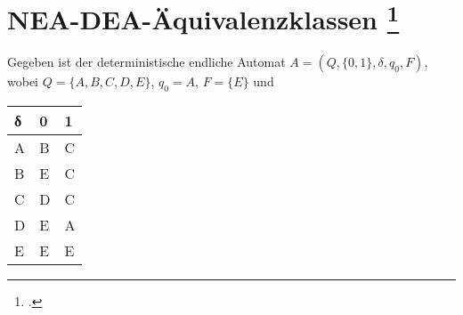 \documentclass{lehramt-informatik-aufgabe}
\begin{document}
\section{NEA-DEA-Äquivalenzklassen
\footcite{theo:ab:1}}

Gegeben ist der deterministische endliche Automat
$A = (Q, \{ 0, 1 \}, \delta, q_0 , F)$,
wobei
$Q = \{ A, B, C, D, E \}$, $q_0 = A$, $F = \{ E \}$ und

\begin{center}
\begin{tabular}{l||l|l}
δ & 0 & 1 \\\hline\hline
A & B & C \\\hline
B & E & C \\\hline
C & D & C \\\hline
D & E & A \\\hline
E & E & E \\\hline
\end{tabular}
\end{center}
\end{document}
